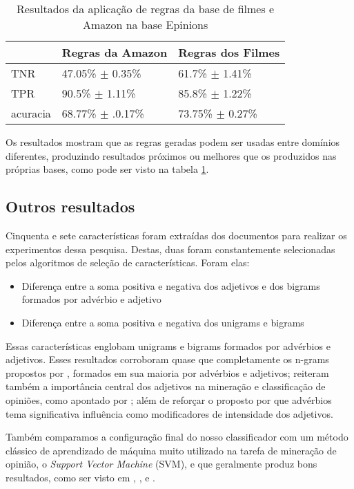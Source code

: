 \begin{table}[!h]
    \begin{tabular}{lll}
    ~         		& Regras da Amazon 					& Regras dos Filmes \\ \hline
    TNR 			& 47.05\% $\pm$ 0.35\%           & 61.7\% $\pm$ 1.41\%    \\
    TPR    		& 90.5\% $\pm$ 1.11\% 				& 85.8\% $\pm$ 1.22\%   \\
    acuracia  	& 68.77\% $\pm$ .0.17\%         	& 73.75\% $\pm$ 0.27\%    \\
    \end{tabular}
    \caption{Resultados da aplicação de regras da base de filmes e Amazon na base Epinions}
	\label{table:epinions}
\end{table}

Os resultados mostram que as regras geradas podem ser usadas entre domínios diferentes, produzindo resultados próximos ou melhores que os produzidos nas próprias bases, como pode ser visto na tabela \ref{table:epinions}.

\subsection{Outros resultados}

Cinquenta e sete características foram extraídas dos documentos para realizar os experimentos dessa pesquisa. Destas, duas foram constantemente selecionadas pelos algoritmos de seleção de características. Foram elas:

\begin{itemize}
\item Diferença entre a soma positiva e negativa dos adjetivos e dos bigrams formados por advérbio e adjetivo
\item Diferença entre a soma positiva e negativa dos unigrams e bigrams
\end{itemize}

Essas características englobam unigrams e bigrams formados por advérbios e adjetivos. Esses resultados corroboram quase que completamente os n-grams propostos por \cite{turney2002thumbs}, formados em sua maioria por advérbios e adjetivos; reiteram também a importância central dos adjetivos na mineração e classificação de opiniões, como apontado por \cite{voll2007not}; além de reforçar o proposto por \cite{benamara2007sentiment} que advérbios tema significativa influência como modificadores de intensidade dos adjetivos.

Também comparamos a configuração final do nosso classificador com um método clássico de aprendizado de máquina muito utilizado na tarefa de mineração de opinião, o \textit{Support Vector Machine} (SVM), e que geralmente produz bons resultados, como ser visto em \cite{moraes2012document}, \cite{pang2002thumbs}, \cite{pang2004sentimental} e \cite{wilson2004just}. 

